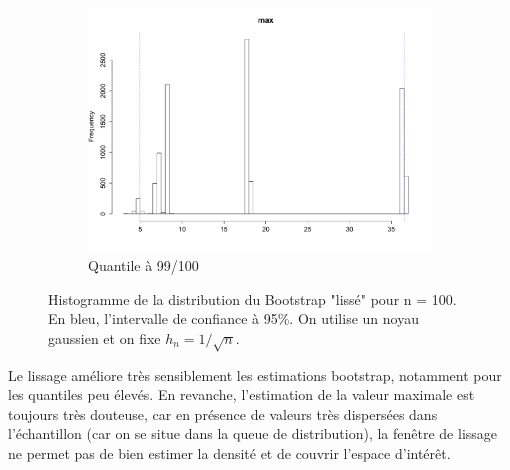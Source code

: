 \documentclass{article}
\renewcommand*{\(}{ \left( }
\renewcommand*{\)}{ \right) }
\begin{document}
\begin{figure}[H]
\begin{subfigure}[t]{0.3\textwidth}
        \includegraphics[width = \linewidth]{img/BootstrapSmooth-Max-100.pdf}
        \caption{Quantile à 99/100}
        \label{fig:smoothBMax}
    \end{subfigure}%
    \caption{Histogramme de la distribution du Bootstrap "lissé" pour n = 100. En bleu, l'intervalle de confiance à 95\%. On utilise un noyau gaussien et on fixe $h_n =1/\sqrt{n}$.}
    \label{fig:smoothB}
\end{figure}

Le lissage améliore très sensiblement les estimations bootstrap, notamment pour les quantiles peu élevés. En revanche, l'estimation de la valeur maximale est toujours très douteuse, car en présence de valeurs très dispersées dans l'échantillon (car on se situe dans la queue de distribution), la fenêtre de lissage ne permet pas de bien estimer la densité et de couvrir l'espace d'intérêt.
\end{document}
